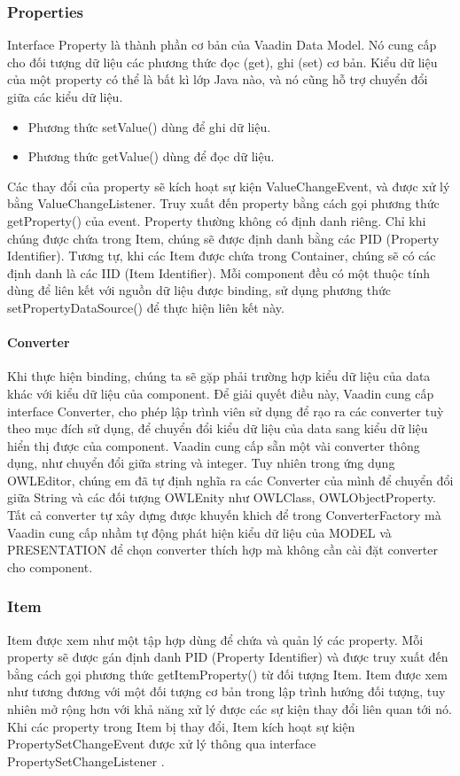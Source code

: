 \subsubsection{Properties}
Interface Property là thành phần cơ bản của Vaadin Data Model. Nó cung cấp cho đối tượng dữ liệu các phương thức đọc (get), ghi (set) cơ bản. Kiểu dữ liệu của một property có thể là bất kì lớp Java nào, và nó cũng hỗ trợ chuyển đổi giữa các kiểu dữ liệu.
\begin{itemize}
\item Phương thức setValue() dùng để ghi dữ liệu.
\item Phương thức getValue() dùng để đọc dữ liệu.
\end{itemize}
Các thay đổi của property sẽ kích hoạt sự kiện ValueChangeEvent, và được xử lý bằng ValueChangeListener. Truy xuất đến property bằng cách gọi phương thức getProperty() của event. Property thường không có định danh riêng. Chỉ khi chúng được chứa trong Item, chúng sẽ được định danh bằng các PID (Property Identifier). Tương tự, khi các Item được chứa trong Container, chúng sẽ có các định danh là các IID (Item Identifier). Mỗi component đều có một thuộc tính dùng để liên kết với nguồn dữ liệu được binding, sử dụng phương thức setPropertyDataSource() để thực hiện liên kết này.
\paragraph{Converter} Khi thực hiện binding, chúng ta sẽ gặp phải trường hợp kiểu dữ liệu của data khác với kiểu dữ liệu của component. Để giải quyết điều này, Vaadin cung cấp interface Converter, cho phép lập trình viên sử dụng để rạo ra các converter tuỳ theo mục đích sử dụng, để chuyển đổi kiểu dữ liệu của data sang kiểu dữ liệu hiển thị được của component. Vaadin cung cấp sẵn một vài converter thông dụng, như chuyển đổi giữa string và integer. Tuy nhiên trong ứng dụng OWLEditor, chúng em đã tự định nghĩa ra các Converter của mình để chuyển đổi giữa String và các đối tượng OWLEnity như OWLClass, OWLObjectProperty. Tất cả converter tự xây dựng được khuyến khich để trong ConverterFactory mà Vaadin cung cấp nhầm tự động phát hiện kiểu dữ liệu của MODEL và PRESENTATION để chọn converter thích hợp mà không cần cài đặt converter cho component.
\subsubsection{Item} Item được xem như một tập hợp dùng để chứa và quản lý các property. Mỗi property sẽ được gán định danh PID (Property Identifier) và được truy xuất đến bằng cách gọi phương thức getItemProperty() từ đối tượng Item. Item được xem như tương đương với một đối tượng cơ bản trong lập trình hướng đối tượng, tuy nhiên mở rộng hơn với khả năng xử lý được các sự kiện thay đổi liên quan tới nó. Khi các property trong Item bị thay đổi, Item kích hoạt sự kiện PropertySetChangeEvent được xử lý thông qua interface PropertySetChangeListener .

